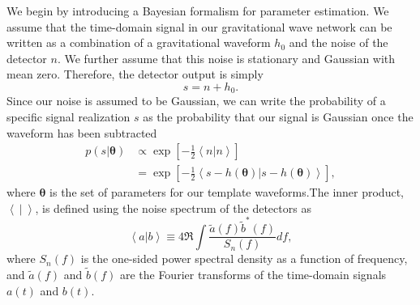 \documentclass{emulateapj}
\begin{document}
We begin by introducing a Bayesian formalism for parameter estimation. 
We assume that the time-domain signal in our gravitational wave
network can be written as a combination of a gravitational
waveform $h_0$ and the noise of the detector $n$.  We further assume
that this noise is stationary and Gaussian with mean zero.  Therefore,
the detector output is simply
\begin{equation}
s = n + h_0 .
\label{SignalAddition}
\end{equation}
Since our noise is assumed to be Gaussian, we can write the
probability of a specific signal realization $s$ as the probability
that our signal is Gaussian once the waveform has been subtracted
\begin{align}
  p(s | \boldsymbol{\theta}) &\propto \exp\left[-\frac{1}{2}\left<n|n
    \right>\right] \nonumber \\ &= \exp\left[-\frac{1}{2}\left < s -
    h(\boldsymbol{\theta}) | s-h(\boldsymbol{\theta})\right >\right] ,
  \label{likelihood}
\end{align}
where $\boldsymbol{\theta}$ is the set of parameters for our template
waveforms.The inner product, $\left< ~|~ \right> $, is defined using the noise
spectrum of the detectors as
\begin{equation}
  \left<a|b\right> \equiv 4 \Re \int \frac{\tilde{a}(f)\tilde{b}^*(f)}{S_n(f)} df ,
  \label{innerProduct}
\end{equation}
where $S_n(f)$ is the one-sided power spectral density as a function
of frequency, and $\tilde{a}(f)$ and $\tilde{b}(f)$ are the Fourier
transforms of the time-domain signals $a(t)$ and $b(t)$.
 
\end{document}
